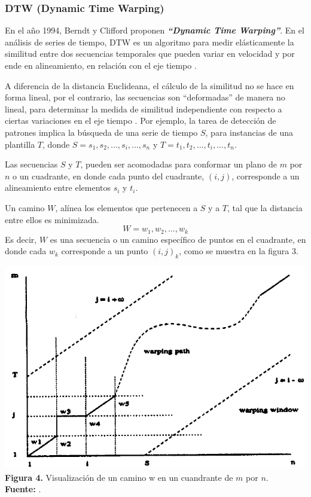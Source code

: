 \subsubsection{\textbf{DTW (Dynamic Time Warping})}
En el a\~no 1994, Berndt y Clifford \cite{dtw} proponen \textit{\textbf{\enquote{Dynamic Time Warping}}}. En el an\'alisis de series de tiempo, DTW es un algoritmo para medir el\'asticamente la similitud entre dos secuencias temporales que pueden variar en velocidad y por ende en alineamiento, en relaci\'on con el eje tiempo \cite{concepts}.\par A diferencia de la distancia Euclideana, el c\'alculo de la similitud no se hace en forma lineal, por el contrario, las secuencias son \enquote{deformadas} de manera no li\-neal, para determinar la medida de similitud independiente con respecto a ciertas variaciones en el eje tiempo \cite{dtw}. Por ejemplo, la tarea de detecci\'on de patrones implica la b\'usqueda de una serie de tiempo $S$, para instancias de una plantilla $T$, donde $S = s_1, s_2, ..., s_i, ..., s_n$ y $T = t_1, t_2, ..., t_i, ..., t_n$.\par
Las secuencias $S$ y $T$, pueden ser acomodadas para conformar un plano de $m$ por $n$ o un cuadrante, en donde cada punto del cuadrante, $(i, j)$, corresponde a un alineamiento entre elementos $s_i$ y $t_i$.\par
Un camino $W$, al\'inea los elementos que pertenecen a $S$ y a $T$, tal que la distancia entre ellos es minimizada.\\
\begin{equation}
W = w_1, w_2, ..., w_k
\end{equation}
Es decir, $W$ es una secuencia o un camino espec\'ifico de puntos en el cuadrante, en donde cada $w_k$ corresponde a un punto $(i,j)_k$, como se muestra en la figura 3.
\begin{center}
\includegraphics[scale=0.7]{dtw.png}\\
\vspace*{10pt}
\footnotesize{\textbf{Figura 4.} Visualizaci\'on de un camino w en un cuandrante de $m$ por $n$.}\\ \textbf{Fuente:} \cite{dtw}.
\end{center}
